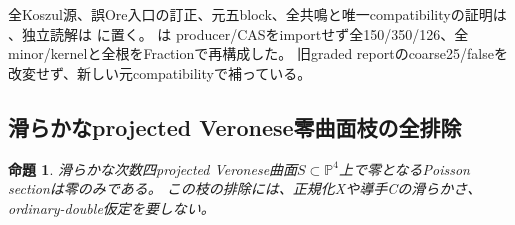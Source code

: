 \documentclass[a4paper,11pt]{ltjsarticle}
\newtheorem{proposition}{命題}[section]
\theoremstyle{definition}
\begin{document}
全Koszul源、誤Ore入口の訂正、元五block、全共鳴と唯一compatibilityの証明は
、独立読解は
に置く。
は
producer/CASをimportせず全150/350/126、全minor/kernelと全根をFractionで再構成した。
旧graded reportのcoarse25/falseを改変せず、新しい元compatibilityで補っている。

\subsection{滑らかなprojected Veronese零曲面枝の全排除}
\begin{proposition}\label{prop:projected-veronese-zero}
滑らかな次数四projected Veronese曲面$S\subset\mathbb P^4$上で零となるPoisson sectionは零のみである。
この枝の排除には、正規化Xや導手Cの滑らかさ、ordinary-double仮定を要しない。
\end{proposition}
\end{document}
